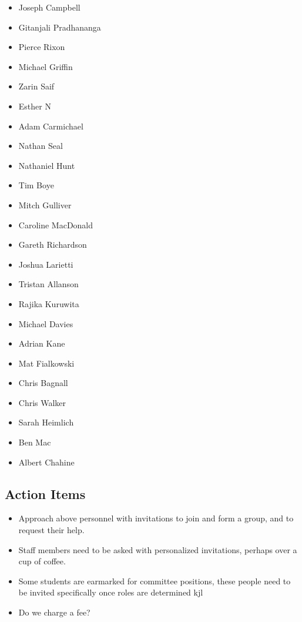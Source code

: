 \begin{itemize}
  \item Joseph Campbell
  \item Gitanjali Pradhananga
  \item Pierce Rixon
  \item Michael Griffin
  \item Zarin Saif
  \item Esther N
  \item Adam Carmichael
  \item Nathan Seal
  \item Nathaniel Hunt
  \item Tim Boye
  \item Mitch Gulliver
  \item Caroline MacDonald
  \item Gareth Richardson
  \item Joshua Larietti
  \item Tristan Allanson
  \item Rajika Kuruwita
  \item Michael Davies
  \item Adrian Kane
  \item Mat Fialkowski
  \item Chris Bagnall
  \item Chris Walker
  \item Sarah Heimlich
  \item Ben Mac
  \item Albert Chahine
\end{itemize}

\subsection{Action Items}
\begin{itemize}
  \item Approach above personnel with invitations to join and form a group, and
  to request their help.
  \item Staff members need to be asked with personalized invitations, perhaps
  over a cup of coffee.
  \item Some students are earmarked for committee positions, these people need
  to be invited specifically once roles are determined  kjl
  \item Do we charge a fee?
\end{itemize}